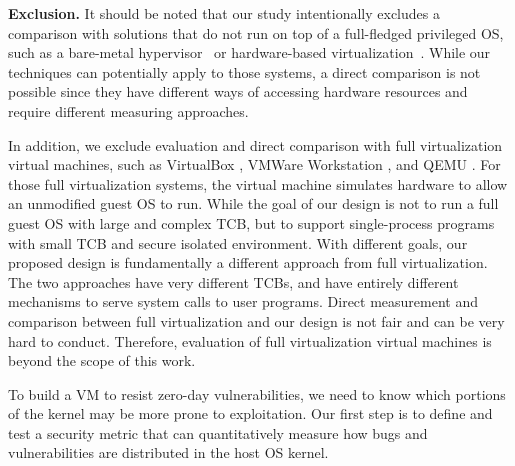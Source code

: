 \noindent
\textbf{Exclusion.}
It should be noted that our study intentionally excludes %
a comparison with solutions that do not run on top of a 
full-fledged privileged OS, such as 
a bare-metal hypervisor~\cite{Xen-03, VMWare-Server} or 
hardware-based virtualization~\cite{IntelVT, keller2010nohype}. 
While our techniques can potentially apply to those 
systems, a direct comparison is not possible since they have different 
ways of accessing hardware resources and require different measuring approaches. 

In addition, we exclude evaluation and direct comparison with full virtualization virtual machines, 
such as VirtualBox \cite{VirtualBox}, VMWare Workstation \cite{VMWare-Workstation}, and QEMU \cite{QEMU}. 
For those full virtualization systems, 
the virtual machine simulates hardware to allow an unmodified guest OS to run. While the goal 
of our design is not to run a full guest OS with large and complex TCB, but to support single-process 
programs with small TCB and secure isolated environment. With different goals, our proposed design is fundamentally 
a different approach from full virtualization. The two approaches have very different TCBs, and have entirely different 
mechanisms to serve system calls to user programs. Direct measurement and comparison between full virtualization 
and our design is not fair and can be very hard to conduct. Therefore, evaluation of full virtualization virtual machines is 
beyond the scope of this work.  

To build a VM to resist zero-day vulnerabilities, we need to know which
portions of the kernel may be more prone to exploitation. Our first step is to
define and test a security metric that can quantitatively measure how bugs and
vulnerabilities are distributed in the host OS kernel.
